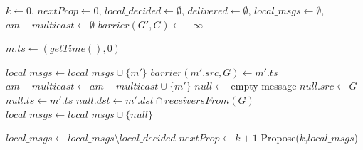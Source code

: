 \documentclass[times, 10pt]{article}
\begin{document}
\begin{algorithm}
\begin{distribalgo}[1]

\blankline
{}
  \STATE $k \leftarrow 0$, $nextProp \leftarrow 0$, $local\_decided \leftarrow \emptyset$, $delivered \leftarrow \emptyset$, $local\_msgs \leftarrow \emptyset$, $am-multicast \leftarrow \emptyset$
    \STATE $barrier(G',G) \leftarrow -\infty$ 
  \ENDINDENT
\ENDINDENT 

\blankline
{}
  \STATE $m.ts \leftarrow (getTime(),0)$
  \STATE {}
\ENDINDENT

\blankline
{}
    \STATE $local\_msgs \leftarrow local\_msgs \cup \{m'\}$
    \STATE $barrier(m'.src,G) \leftarrow m'.ts$ \label{algline:incbar}
      \STATE $am-multicast \leftarrow am-multicast \cup \{m'\}$
    \ENDIF
      \STATE $null \leftarrow$ empty message
      \STATE $null.src \leftarrow G$
      \STATE $null.ts \leftarrow m'.ts$ \label{algline:nulltsmts}
      \STATE $null.dst \leftarrow m'.dst \cap receiversFrom(G)$
      \STATE $local\_msgs \leftarrow local\_msgs \cup \{null\}$
    \ENDIF
  \ENDIF
\ENDINDENT

\blankline
{}
    \STATE $local\_msgs \leftarrow local\_msgs \setminus local\_decided$%
    \label{algline:nullstays}
      \STATE $nextProp \leftarrow k + 1$
      \STATE Propose($k$,$local\_msgs$)
    \ENDIF
\ENDINDENT


\end{distribalgo}
\end{algorithm}
\end{document}
